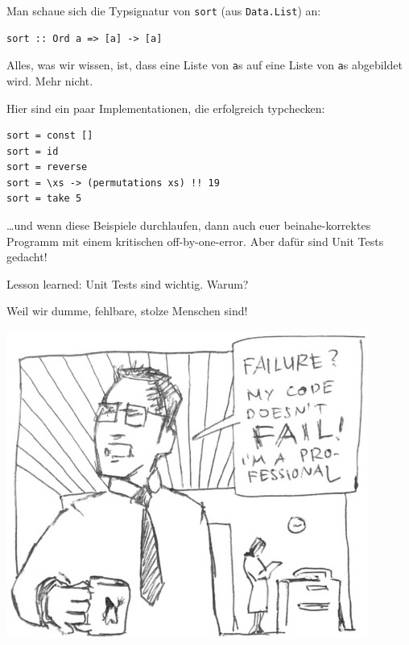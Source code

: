 \documentclass{beamer}
\begin{document}
\begin{frame}[fragile]

Man schaue sich die Typsignatur von \texttt{sort} (aus \texttt{Data.List}) an:

\begin{verbatim}
sort :: Ord a => [a] -> [a]
\end{verbatim}

Alles, was wir wissen, ist, dass eine Liste von \texttt{a}s auf eine Liste von \texttt{a}s abgebildet wird. Mehr nicht.
\pause
\smallskip

Hier sind ein paar Implementationen, die erfolgreich typchecken:

\begin{verbatim}
sort = const []
sort = id
sort = reverse
sort = \xs -> (permutations xs) !! 19
sort = take 5
\end{verbatim}
\pause

\dots und wenn diese Beispiele durchlaufen, dann auch euer beinahe-korrektes Programm mit einem kritischen off-by-one-error. Aber dafür sind Unit Tests gedacht!
\end{frame}


\begin{frame}
Lesson learned: Unit Tests sind wichtig. Warum?\pause

Weil wir dumme, fehlbare, stolze Menschen sind!

\begin{center}
\includegraphics[scale=0.45]{unit_tests.jpg} 
\end{center}

\end{frame}
\end{document}
